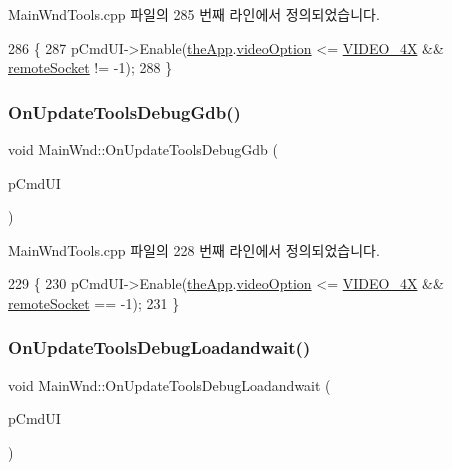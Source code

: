 Main\+Wnd\+Tools.\+cpp 파일의 285 번째 라인에서 정의되었습니다.


\begin{DoxyCode}
286 \{
287   pCmdUI->Enable(\mbox{\hyperlink{_v_b_a_8cpp_a8095a9d06b37a7efe3723f3218ad8fb3}{theApp}}.\mbox{\hyperlink{class_v_b_a_a17dac073149c897f770c00ed7098ad32}{videoOption}} <= \mbox{\hyperlink{_v_b_a_8h_a531c35e38ede3ea4e5ba5afb24b29493a6468bce6b84e6350d3de126f257eb38d}{VIDEO\_4X}} && 
      \mbox{\hyperlink{_main_wnd_tools_8cpp_a4fdb1b96f709fc5cdd1d013c1703e484}{remoteSocket}} != -1);
288 \}
\end{DoxyCode}
\mbox{\label{class_main_wnd_a0b78ffc6321596788767291e2d139e6f}} 
\subsubsection{\texorpdfstring{On\+Update\+Tools\+Debug\+Gdb()}{OnUpdateToolsDebugGdb()}}
{\footnotesize\ttfamily void Main\+Wnd\+::\+On\+Update\+Tools\+Debug\+Gdb (\begin{DoxyParamCaption}\item[{C\+Cmd\+UI $\ast$}]{p\+Cmd\+UI }\end{DoxyParamCaption})\hspace{0.3cm}{\ttfamily [protected]}}



Main\+Wnd\+Tools.\+cpp 파일의 228 번째 라인에서 정의되었습니다.


\begin{DoxyCode}
229 \{
230   pCmdUI->Enable(\mbox{\hyperlink{_v_b_a_8cpp_a8095a9d06b37a7efe3723f3218ad8fb3}{theApp}}.\mbox{\hyperlink{class_v_b_a_a17dac073149c897f770c00ed7098ad32}{videoOption}} <= \mbox{\hyperlink{_v_b_a_8h_a531c35e38ede3ea4e5ba5afb24b29493a6468bce6b84e6350d3de126f257eb38d}{VIDEO\_4X}} && 
      \mbox{\hyperlink{_main_wnd_tools_8cpp_a4fdb1b96f709fc5cdd1d013c1703e484}{remoteSocket}} == -1);
231 \}
\end{DoxyCode}
\mbox{\label{class_main_wnd_a747e0b43ebf87f4b3551767a9fce4d9e}} 
\subsubsection{\texorpdfstring{On\+Update\+Tools\+Debug\+Loadandwait()}{OnUpdateToolsDebugLoadandwait()}}
{\footnotesize\ttfamily void Main\+Wnd\+::\+On\+Update\+Tools\+Debug\+Loadandwait (\begin{DoxyParamCaption}\item[{C\+Cmd\+UI $\ast$}]{p\+Cmd\+UI }\end{DoxyParamCaption})\hspace{0.3cm}{\ttfamily [protected]}}



